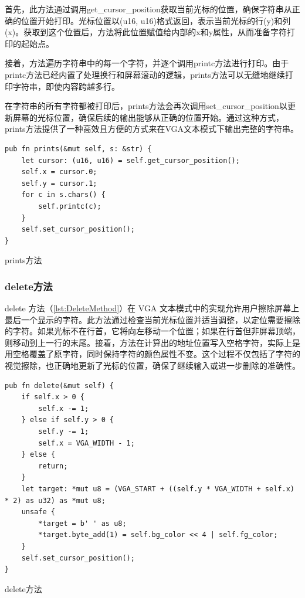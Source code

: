 首先，此方法通过调用get\_cursor\_position获取当前光标的位置，确保字符串从正确的位置开始打印。光标位置以(u16, u16)格式返回，表示当前光标的行(y)和列(x)。获取到这个位置后，方法将此位置赋值给内部的x和y属性，从而准备字符打印的起始点。

接着，方法遍历字符串中的每一个字符，并逐个调用printc方法进行打印。由于printc方法已经内置了处理换行和屏幕滚动的逻辑，prints方法可以无缝地继续打印字符串，即使内容跨越多行。

在字符串的所有字符都被打印后，prints方法会再次调用set\_cursor\_position以更新屏幕的光标位置，确保后续的输出能够从正确的位置开始。通过这种方式，prints方法提供了一种高效且方便的方式来在VGA文本模式下输出完整的字符串。

\begin{listing}[htbp]
    \begin{verbatim}
pub fn prints(&mut self, s: &str) {
    let cursor: (u16, u16) = self.get_cursor_position();
    self.x = cursor.0;
    self.y = cursor.1;
    for c in s.chars() {
        self.printc(c);
    }
    self.set_cursor_position();
}
    \end{verbatim}
    \caption{prints方法}\label{lst:PrintsMethod}
\end{listing}

\subsubsection{delete方法}

delete 方法（\cref{lst:DeleteMethod}）在 VGA 文本模式中的实现允许用户擦除屏幕上最后一个显示的字符。此方法通过检查当前光标位置并适当调整，以定位需要擦除的字符。如果光标不在行首，它将向左移动一个位置；如果在行首但非屏幕顶端，则移动到上一行的末尾。接着，方法在计算出的地址位置写入空格字符，实际上是用空格覆盖了原字符，同时保持字符的颜色属性不变。这个过程不仅包括了字符的视觉擦除，也正确地更新了光标的位置，确保了继续输入或进一步删除的准确性。

\begin{listing}[htbp]
    \begin{verbatim}
pub fn delete(&mut self) {
    if self.x > 0 {
        self.x -= 1;
    } else if self.y > 0 {
        self.y -= 1;
        self.x = VGA_WIDTH - 1;
    } else {
        return;
    }
    let target: *mut u8 = (VGA_START + ((self.y * VGA_WIDTH + self.x) * 2) as u32) as *mut u8;
    unsafe {
        *target = b' ' as u8;
        *target.byte_add(1) = self.bg_color << 4 | self.fg_color;
    }
    self.set_cursor_position();
}
    \end{verbatim}
    \caption{delete方法}\label{lst:DeleteMethod}
\end{listing}

